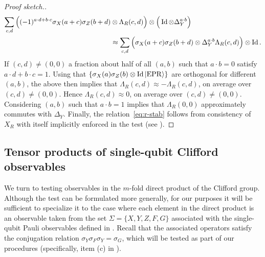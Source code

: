 \documentclass{toc}
\newcommand{\ket}[1]{|#1\rangle}
\newcommand{\Id}{\ensuremath{\mathop{\rm Id}\nolimits}}
\newcommand{\EPR}{{\rm EPR}}
\newcommand{\phase}{\Lambda}
\begin{document}
\begin{proof}[Proof sketch.]
\begin{align*}
\sum_{c,d} \Big((-1)^{a\cdot d  +b\cdot c}\sigma_X(a+c)\sigma_Z(b+d) &\otimes \phase_R(c,d)\Big) \otimes \Big(\Id \otimes \Delta_Y^{a\cdot b}\Big)\\
& \approx \sum_{c,d} \Big( \sigma_X(a+c)\sigma_Z(b+d) \otimes \Delta_Y^{a\cdot b } \phase_R(c,d)\Big) \otimes \Id .
\end{align*}
If $(c,d)\neq (0,0)$ a fraction about half of all $(a,b)$ such that $a\cdot b = 0$ satisfy $a\cdot d + b\cdot c = 1$. Using that $\{\sigma_X(a)\sigma_Z(b) \otimes \Id \ket{\EPR}\}$ are orthogonal for different $(a,b)$, the above then implies that $\phase_R(c,d)\approx -\phase_R(c,d)$, on average over $(c,d)\neq (0,0)$. Hence $\phase_R(c,d)\approx 0$, on average over $(c,d)\neq (0,0)$. 
Considering $(a,b)$ such that $a\cdot b=1$ implies that $\phase_R(0,0)$ approximately commutes with $\Delta_Y$. Finally, the relation~\eqref{eq:r-stab} follows from consistency of $X_R$ with itself implicitly enforced in the test (see ).
\end{proof}

\subsection{Tensor products of single-qubit Clifford observables}
\label{sec:n-2-clifford}

We turn to testing observables in the $m$-fold direct product of the Clifford group. Although the test can be formulated more generally, for our purposes it will be sufficient to specialize it to the case where each element in the direct product is an observable taken from the set  $\Sigma = \{X,Y,Z,F,G\}$ associated with the single-qubit Pauli observables defined in . Recall that the associated operators satisfy the conjugation relation $\sigma_Y \sigma_F \sigma_Y = \sigma_G$, which will be tested as part of our procedures (specifically, item (c) in ).
\end{document}

